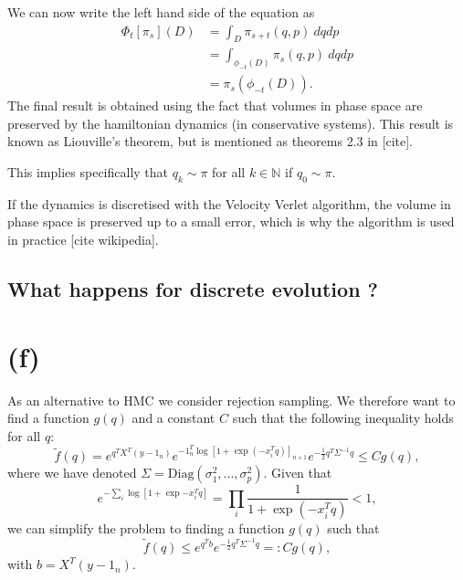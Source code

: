 \documentclass[a4paper, 12pt,oneside]{article}
\begin{document}
		We can now write the left hand side of the equation as
		\begin{align}
			\Phi_t[\pi_s](D)&=\int_D \pi_{s+t}(q,p)\ dqdp \\
				&=\int_{\phi_{-t}(D)}\pi_{s}(q,p)\ dqdp \\
				&=\pi_s(\phi_{-t}(D)).
		\end{align}
		The final result is obtained using the fact that volumes in phase space are preserved by the hamiltonian dynamics (in conservative systems). This result is known as Liouville's theorem, but is mentioned as theorems 2.3 in [cite].

		This implies specifically that $q_k\sim\pi$ for all $k\in\mathbb{N}$ if $q_0\sim \pi$. 

		If the dynamics is discretised with the Velocity Verlet algorithm, the volume in phase space is preserved up to a small error, which is why the algorithm is used in practice [cite wikipedia]. 
        \subsection{What happens for discrete evolution ?}
	\section{(f)}
	As an alternative to HMC we consider rejection sampling. We therefore want to find a function $g(q)$ and a constant $C$ such that the following inequality holds for all $q$:
	\begin{equation}
		\tilde{f}(q) = e^{q^TX^T(y-1_{n})}e^{-1_{n}^T \log[1+\exp(-x_i^Tq)]_{n\times 1}}e^{-\frac{1}{2}q^T\Sigma^{-1} q} \leq Cg(q),
	\end{equation}
	where we have denoted $\Sigma=\text{Diag}(\sigma_1^2,...,\sigma_p^2)$.
	Given that 
	\begin{equation}
		e^{-\sum_i \log[1+\exp{-x_i^Tq}]} = \prod_i \frac{1}{1+\exp(-x_i^Tq)}<1,
	\end{equation}
	we can simplify the problem to finding a function $g(q)$ such that
	\begin{equation}
		\tilde{f}(q) \le e^{q^Tb}e^{-\frac{1}{2}q^T\Sigma^{-1} q} =: Cg(q),
	\end{equation}
	with $b=X^T(y-1_{n})$. 
\end{document}

